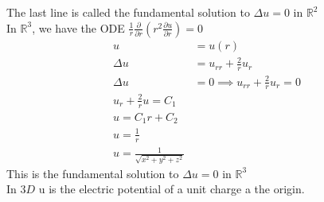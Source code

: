 \documentclass[answers,12pt,addpoints]{exam}
\begin{document}
The last line is called the fundamental solution to $\Delta u = 0$ in $\mathbb{R}^2$\\
In $\mathbb{R}^3$, we have the ODE $\frac{1}{r} \frac{\partial }{\partial r} (r^2 \frac{\partial u}{\partial r}) = 0$\\
\begin{align*}
    u &= u(r)\\
    \Delta u &= u_{rr} + \frac{2}{r} u_r\\
    \Delta u &= 0 \implies u_{rr} + \frac{2}{r} u_r = 0\\
    u_r + \frac{2}{r} u = C_1\\
    u = C_1 r + C_2\\
    u = \frac{1}{r} \\
    u = \frac{1}{\sqrt{x^2 + y^2 + z^2}}
\end{align*}
This is the fundamental solution to $\Delta u = 0$ in $\mathbb{R}^3$\\
In $3D$ u is the electric potential of a unit charge a the origin. 
\end{document}
